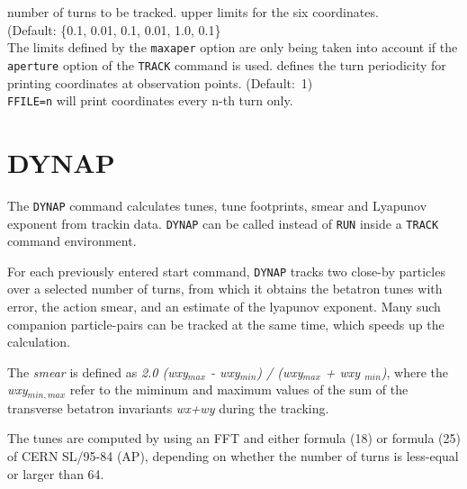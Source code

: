 \begin{madlist}
   number of turns to be tracked.
   upper limits for the six coordinates.\\
  (Default: \{0.1, 0.01, 0.1, 0.01, 1.0, 0.1\} \\
  The limits defined by the \texttt{maxaper} option are only being taken
  into account if the \texttt{aperture} option of the \texttt{TRACK}
  command is used. 
   defines the turn periodicity for printing coordinates at
   observation points. (Default:~1)\\
   \texttt{FFILE=n} will print coordinates every n-th turn only. 
\end{madlist}



\section{DYNAP}

The \texttt{DYNAP} command calculates tunes, tune footprints, smear and
Lyapunov exponent from trackin data. \texttt{DYNAP} can be called
instead of \texttt{RUN} inside a \texttt{TRACK} command environment.

 
For each previously entered start command, \texttt{DYNAP} tracks two
close-by particles over a selected number of turns, from which it
obtains the betatron tunes with error, the action smear, and an estimate
of the lyapunov exponent. 
Many such companion particle-pairs can be tracked at the same time,
which speeds up the calculation. 

The \textit{smear} is 
defined as  \textit{2.0 (wxy$_{max}$ - wxy$_{min}$) / (wxy$_{max}$ + wxy
  $_{min}$)}, where the \textit{wxy$_{min,max}$} refer to the  miminum and
maximum values of the sum of the transverse betatron invariants
\textit{wx+wy} during the tracking. 

The tunes are computed by using an FFT and either formula (18) or formula (25) of CERN SL/95-84 (AP),
depending on whether the number of turns is less-equal or larger than 64. 
 
